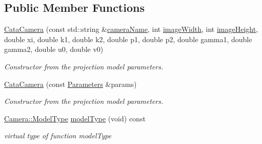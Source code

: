 \subsection*{Public Member Functions}
\begin{DoxyCompactItemize}
\item 
\mbox{\label{classcamodocal_1_1CataCamera_a648e788b11ea6037f95e3d7fb52c319b}} 
\hyperlink{classcamodocal_1_1CataCamera_a648e788b11ea6037f95e3d7fb52c319b}{Cata\+Camera} (const std\+::string \&\hyperlink{classcamodocal_1_1CataCamera_a0d7729df53b75f8c616a8fc43b7aba13}{camera\+Name}, int \hyperlink{classcamodocal_1_1CataCamera_a12efd82807e3f3baa13c3d5e344ac6a4}{image\+Width}, int \hyperlink{classcamodocal_1_1CataCamera_a858e474daed69f8bbe3aa6d6a1e7d3cc}{image\+Height}, double xi, double k1, double k2, double p1, double p2, double gamma1, double gamma2, double u0, double v0)
\begin{DoxyCompactList}\small\item\em Constructor from the projection model parameters. \end{DoxyCompactList}\item 
\mbox{\label{classcamodocal_1_1CataCamera_aa5b09599be0386cf19099b11e23e51eb}} 
\hyperlink{classcamodocal_1_1CataCamera_aa5b09599be0386cf19099b11e23e51eb}{Cata\+Camera} (const \hyperlink{classcamodocal_1_1CataCamera_1_1Parameters}{Parameters} \&params)
\begin{DoxyCompactList}\small\item\em Constructor from the projection model parameters. \end{DoxyCompactList}\item 
\mbox{\label{classcamodocal_1_1CataCamera_a35b52f562558905b13f51a2a5879ebb1}} 
\hyperlink{classcamodocal_1_1Camera_a663bb19b7b1f38f6d1b7eeb0890183ff}{Camera\+::\+Model\+Type} \hyperlink{classcamodocal_1_1CataCamera_a35b52f562558905b13f51a2a5879ebb1}{model\+Type} (void) const
\begin{DoxyCompactList}\small\item\em virtual type of function model\+Type \end{DoxyCompactList}\item 
\mbox{\label{classcamodocal_1_1CataCamera_a0d7729df53b75f8c616a8fc43b7aba13}} 

\end{DoxyCompactItemize}
